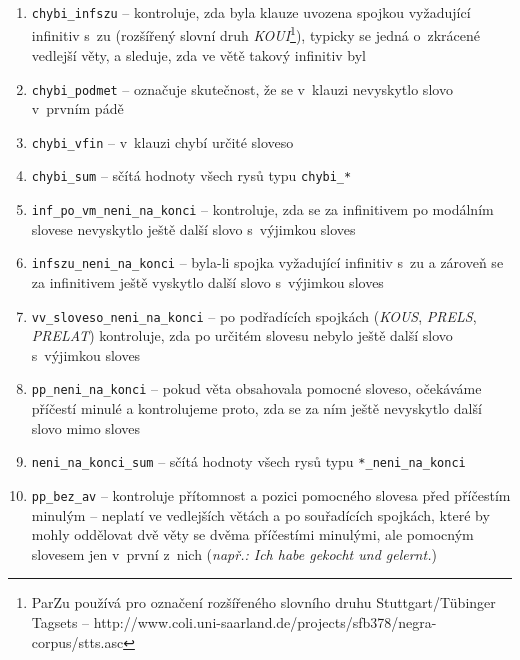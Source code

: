 \documentclass[12pt,a4paper]{report}
\begin{document}
\begin{enumerate}
\item{\texttt{chybi\_infszu} -- kontroluje, zda byla klauze uvozena spojkou vyžadující infinitiv s~zu (rozšířený slovní druh \textit{KOUI}\footnote{ParZu používá pro označení rozšířeného slovního druhu Stuttgart/Tübinger Tagsets -- http://www.coli.uni-saarland.de/projects/sfb378/negra-corpus/stts.asc}), typicky se jedná o~zkrácené vedlejší věty, a sleduje, zda ve větě takový infinitiv byl}
\item{\texttt{chybi\_podmet} -- označuje skutečnost, že se v~klauzi nevyskytlo slovo v~prvním pádě}
\item{\texttt{chybi\_vfin} -- v~klauzi chybí určité sloveso}
\item{\texttt{chybi\_sum} -- sčítá hodnoty všech rysů typu \texttt{chybi\_*}}
\item{\texttt{inf\_po\_vm\_neni\_na\_konci} -- kontroluje, zda se za infinitivem po modálním slovese nevyskytlo ještě další slovo s~výjimkou sloves}
\item{\texttt{infszu\_neni\_na\_konci} -- byla-li spojka vyžadující infinitiv s~zu a zároveň se za infinitivem ještě vyskytlo další slovo s~výjimkou sloves}
\item{\texttt{vv\_sloveso\_neni\_na\_konci} -- po podřadících spojkách (\textit{KOUS}, \textit{PRELS}, \textit{PRELAT}) kontroluje, zda po určitém slovesu nebylo ještě další slovo s~výjimkou sloves}
\item{\texttt{pp\_neni\_na\_konci} -- pokud věta obsahovala pomocné sloveso, očekáváme příčestí minulé a kontrolujeme proto, zda se za ním ještě nevyskytlo další slovo mimo sloves}
\item{\texttt{neni\_na\_konci\_sum} -- sčítá hodnoty všech rysů typu \texttt{*\_neni\_na\_konci}}
\item{\texttt{pp\_bez\_av} -- kontroluje přítomnost a pozici pomocného slovesa před příčestím minulým -- neplatí ve vedlejších větách a po souřadících spojkách, které by mohly oddělovat dvě věty se dvěma příčestími minulými, ale pomocným slovesem jen v~první z~nich (\textit{např.: Ich habe gekocht und gelernt.})}





\end{enumerate}
\end{document}
